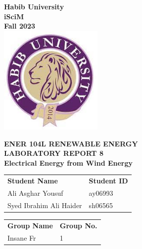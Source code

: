 \documentclass[a4paper, 12pt, english]{article}
\begin{document}
\begin{titlepage}
	\begin{center}
		\textbf{\LARGE Habib University}\\[0.5cm]
		\textbf{\large iSciM}\\[0.2cm]
		\textbf {\large Fall 2023}\\[0.2cm]
		\vspace{20pt}
		\includegraphics[width=5cm]{../habiblogo.jpg}\\[1cm]
		\par
		\vspace{20pt}
		\textbf{\Large ENER 104L RENEWABLE ENERGY}\\
		\vspace{15pt}
		\myrule[1pt][7pt]
		\textbf{\LARGE  LABORATORY REPORT 8}\\
		\vspace{15pt}
		\textbf{\large Electrical Energy from Wind Energy}\\
		\myrule[1pt][7pt]
		\vspace{25pt}
		\begin{tabular}{@{}p{5cm}p{3cm}@{}}
			\textbf{\large Student Name} & \textbf{\large Student ID} \\
			Ali Asghar Yousuf            & ay06993                    \\ %
			Syed Ibrahim Ali Haider      & sh06565                    \\ %
		\end{tabular}

		\vspace{10pt}
		\begin{tabular}{@{}p{5cm}p{3cm}@{}}
			\textbf{\large Group Name} & \textbf{\large Group No.} \\
			Insane Fr                  & 1                         \\
		\end{tabular}


\end{center}
\end{titlepage}
\end{document}
